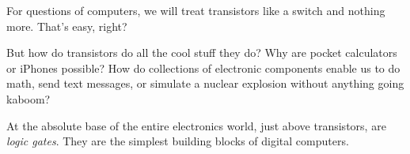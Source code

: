 For questions of computers, we will treat transistors like a switch and nothing more. That's easy, right?

But how do transistors do all the cool stuff they do? Why are pocket calculators or iPhones possible? How do collections of electronic components enable us to do math, send text messages, or simulate a nuclear explosion without anything going kaboom?

At the absolute base of the entire electronics world, just above transistors, are \emph{logic gates}. They are the simplest building blocks of digital computers. 


